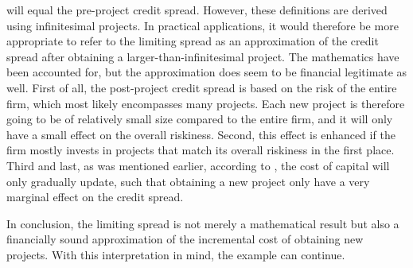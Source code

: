 \documentclass[main.tex]{subfiles}
\begin{document}
        will equal the pre-project credit spread.
        However, these definitions are derived using infinitesimal projects. 
        In practical applications,
        it would therefore be more appropriate to refer to the limiting spread as an approximation 
        of the credit spread after obtaining a larger-than-infinitesimal project.
        The mathematics have been accounted for, 
        but the approximation does seem to be financial legitimate as well.
        First of all, the post-project credit spread is based on the risk of the entire firm,
        which most likely encompasses many projects.
        Each new project is therefore going to be of relatively small size compared
        to the entire firm, and it will only have a small effect on the overall riskiness.
        Second, this effect is enhanced if the firm mostly invests in projects that match
        its overall riskiness in the first place.
        Third and last, as was mentioned earlier, according to \textcite{Castagna2012FVA},
        the cost of capital will only gradually update, 
        such that obtaining a new project only have a very marginal effect on the credit spread.

        In conclusion, the limiting spread is not merely a mathematical result
        but also a financially sound approximation of the incremental cost of obtaining new projects.
        With this interpretation in mind, the example can continue.
\end{document}
